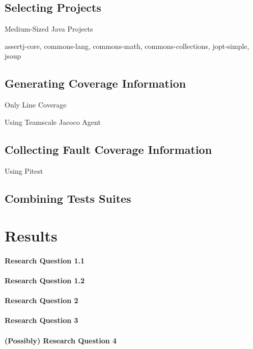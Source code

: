 \subsection{Selecting Projects}

Medium-Sized Java Projects

assertj-core, commons-lang, commons-math, commons-collections, jopt-simple, jsoup

\subsection{Generating Coverage Information}

Only Line Coverage

Using Teamscale Jacoco Agent

\subsection{Collecting Fault Coverage Information}

Using Pitest

\subsection{Combining Tests Suites}

\section{Results}

\paragraph{Research Question 1.1}

\paragraph{Research Question 1.2}

\paragraph{Research Question 2}

\paragraph{Research Question 3}

\paragraph{(Possibly) Research Question 4}

